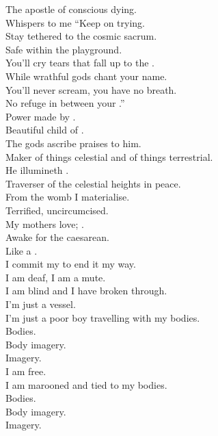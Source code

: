 

The apostle of conscious dying. \\
Whispers to me ``Keep on trying. \\
Stay tethered to the cosmic sacrum. \\
Safe within the  playground. \\
You'll cry tears that fall up to the . \\
While wrathful gods chant your name. \\
You'll never scream, you have no breath. \\
No refuge in between your .'' \\

Power made by . \\
Beautiful child of . \\
The gods ascribe praises to him. \\
Maker of things celestial and of things terrestrial. \\
He illumineth . \\
Traverser of the celestial heights in peace. \\

From the womb I materialise. \\
Terrified, uncircumcised. \\
My mothers love; . \\
Awake for the caesarean. \\
Like a . \\
I commit my  to end it my way. \\
I am deaf, I am a mute. \\
I am blind and I have broken through. \\

I'm just a vessel. \\
I'm just a poor boy travelling with my bodies. \\
Bodies. \\
Body imagery. \\
Imagery. \\
I am free. \\
I am marooned and tied to my bodies. \\
Bodies. \\
Body imagery. \\
Imagery. \\

